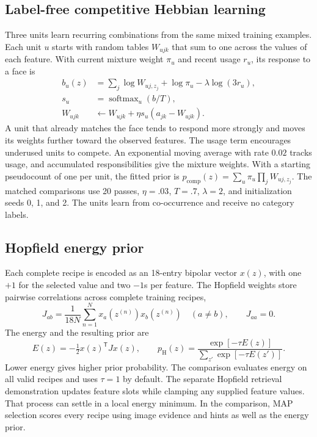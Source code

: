 \documentclass[11pt,letterpaper]{article}
\newcommand{\softmax}{\operatorname{softmax}}
\begin{document}
\subsection{Label-free competitive Hebbian learning}
Three units learn recurring combinations from the same mixed training examples. Each unit $u$ starts with random tables $W_{ujk}$ that sum to one across the values of each feature. With current mixture weight $\pi_u$ and recent usage $r_u$, its response to a face is
\begin{align}
b_u(z) &= \sum_j \log W_{uj,z_j}+\log\pi_u-\lambda\log(3r_u),\\
s_u &= \softmax_u(b/T),\\
W_{ujk} &\leftarrow W_{ujk}+\eta s_u(a_{jk}-W_{ujk}).
\label{eq:competitive}
\end{align}
A unit that already matches the face tends to respond more strongly and moves its weights further toward the observed features. The usage term encourages underused units to compete. An exponential moving average with rate $0.02$ tracks usage, and accumulated responsibilities give the mixture weights. With a starting pseudocount of one per unit, the fitted prior is $p_{\mathrm{comp}}(z)=\sum_u\pi_u\prod_j W_{uj,z_j}$. The matched comparisons use 20 passes, $\eta=.03$, $T=.7$, $\lambda=2$, and initialization seeds 0, 1, and 2. The units learn from co-occurrence and receive no category labels.

\subsection{Hopfield energy prior}
Each complete recipe is encoded as an 18-entry bipolar vector $x(z)$, with one $+1$ for the selected value and two $-1$s per feature. The Hopfield weights store pairwise correlations across complete training recipes,
\begin{equation}
J_{ab}=\frac{1}{18N}\sum_{n=1}^N x_a(z^{(n)})x_b(z^{(n)})\quad(a\ne b),
\qquad J_{aa}=0.
\end{equation}
The energy and the resulting prior are
\begin{equation}
E(z)=-\tfrac12 x(z)^{\mathsf T}Jx(z),
\qquad
p_{\mathrm{H}}(z)=\frac{\exp[-\tau E(z)]}{\sum_{z'}\exp[-\tau E(z')]}.
\end{equation}
Lower energy gives higher prior probability. The comparison evaluates energy on all valid recipes and uses $\tau=1$ by default. The separate Hopfield retrieval demonstration updates feature slots while clamping any supplied feature values. That process can settle in a local energy minimum. In the comparison, MAP selection scores every recipe using image evidence and hints as well as the energy prior.
\end{document}
